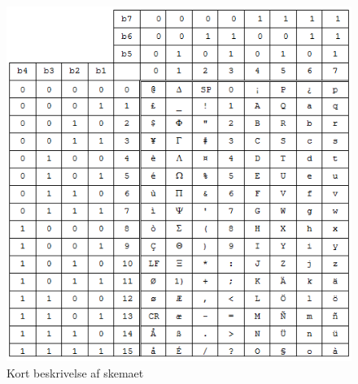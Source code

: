 \begin{figure}[H]
\includegraphics []{Billeder/tegnsaet.png}
\caption {Kort beskrivelse af skemaet}
\label {tegnsaet}
\end{figure}